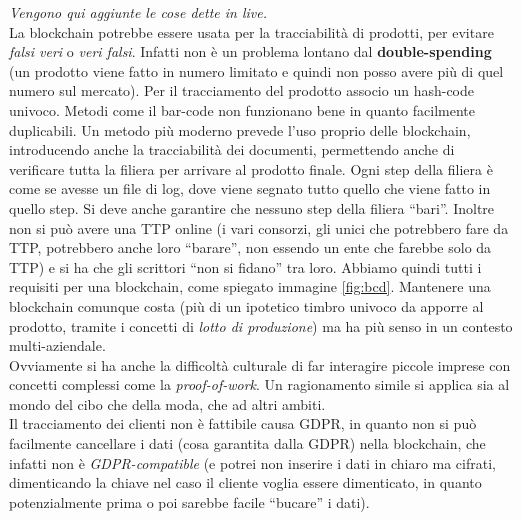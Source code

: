\documentclass[a4paper,12pt, oneside]{book}
\begin{document}
\begin{shaded}
  \noindent
  \textit{Vengono qui aggiunte le cose dette in live.}\\
  La blockchain potrebbe essere usata per la tracciabilità di prodotti, per
  evitare \textit{falsi veri} o \textit{veri falsi}. Infatti non è un problema
  lontano dal \textbf{double-spending} (un prodotto viene fatto in numero
  limitato e quindi non posso avere più di quel numero sul mercato). Per il
  tracciamento del prodotto associo un hash-code univoco. Metodi come il
  bar-code non funzionano bene in quanto facilmente duplicabili. Un metodo più
  moderno prevede l'uso proprio delle blockchain, introducendo anche la
  tracciabilità dei documenti, permettendo anche di verificare tutta la filiera
  per arrivare al prodotto finale. Ogni step della filiera è come se avesse un
  file di log, dove viene segnato tutto quello che viene fatto in quello
  step. Si deve anche garantire che nessuno step della filiera ``bari''. Inoltre
  non si può avere una TTP online (i vari consorzi, gli unici che potrebbero
  fare da TTP, potrebbero anche loro ``barare'', non essendo un ente che farebbe
  solo da TTP) e si ha che gli scrittori ``non si fidano'' tra loro. Abbiamo
  quindi tutti i requisiti per una blockchain, come spiegato immagine
  \ref{fig:bcd}. Mantenere una blockchain comunque costa (più di un ipotetico
  timbro univoco da apporre al prodotto, tramite i concetti di \textit{lotto di
    produzione}) ma ha più senso in un contesto multi-aziendale.\\
  Ovviamente si ha anche la difficoltà culturale di far interagire piccole
  imprese con concetti complessi come la \textit{proof-of-work}. Un ragionamento
  simile si applica sia al mondo del cibo che della moda, che ad altri ambiti.\\
  Il tracciamento dei clienti non è fattibile causa GDPR, in quanto non si può
  facilmente cancellare i dati (cosa garantita dalla GDPR) nella blockchain, che
  infatti non è \textit{GDPR-compatible} (e potrei non inserire i dati in
  chiaro ma cifrati, dimenticando la chiave nel caso il cliente voglia essere
  dimenticato, in quanto potenzialmente prima o poi sarebbe facile ``bucare'' i
  dati).
\end{shaded}
\end{document}
